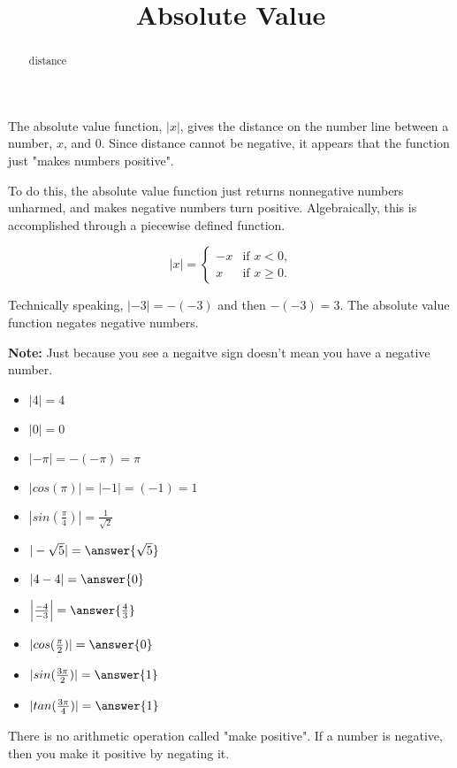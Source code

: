 \documentclass{ximera}
\title{Absolute Value}
\begin{document}
\begin{abstract}
distance
\end{abstract}
\maketitle



The absolute value function, $|x|$, gives the distance on the number line between a number, $x$, and $0$.  Since distance cannot be negative, it appears that the function just "makes numbers positive".


To do this, the absolute value function just returns nonnegative numbers unharmed, and makes negative numbers turn positive.  Algebraically, this is accomplished through a piecewise defined function.






\[
|x| = 
\begin{cases}
  -x &\text{if $x<0$,}\\
  x & \text{if $x\ge 0$}.
\end{cases}
\]


Technically speaking, $|-3| = -(-3)$ and then $-(-3) = 3$.  The absolute value function negates negative numbers.


\textbf{Note:} Just because you see a negaitve sign doesn't mean you have a negative number.



\begin{example}
\begin{itemize}
\item $|4| = 4$
\item $|0| = 0$
\item $|-\pi| = -(-\pi) = \pi$
\item $|cos(\pi)| = |-1| = (-1) = 1$
\item $|sin(\tfrac{\pi}{4})| = \tfrac{1}{\sqrt{2}}$
\end{itemize}
\end{example}





\begin{example}
\begin{itemize}
\item $|-\sqrt{5}| = \answer{\sqrt{5}}$
\item $|4-4| = \answer{0}$
\item $\left|\frac{-4}{-3}\right| = \answer{\frac{4}{3}}$
\item $|cos(\tfrac{\pi}{2})| = \answer{0}$
\item $|sin(\tfrac{3\pi}{2})| = \answer{1}$
\item $|tan(\tfrac{3\pi}{4})| = \answer{1}$
\end{itemize}
\end{example}
There is no arithmetic operation called "make positive".  If a number is negative, then you make it positive by negating it. 
\end{document}
